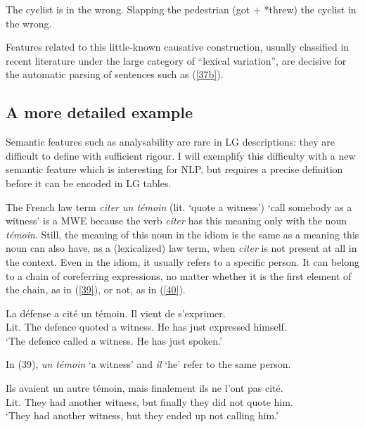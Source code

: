 \documentclass[output=paper]{langsci/langscibook}
\begin{document}
 \begin{exe}
\ex \label{38} 
\begin{xlist}
\ex \label{38a}
The cyclist is in the wrong.
\ex \label{38b} 
Slapping the pedestrian (got $+$ *threw) the cyclist in the wrong.
\end{xlist}
\end{exe}
       

\noindent Features related to this little-known causative construction, usually classified in recent literature under the large category of “lexical variation”, are decisive for the automatic parsing of sentences such as (\ref{37b}).

\subsection{A more detailed example} 

Semantic features such as analysability are rare in LG descriptions: they are difficult to define with sufficient rigour. I will exemplify this difficulty with a new semantic feature which is interesting for NLP, but requires a precise definition before it can be encoded in LG tables.

The French law term \textit{citer un témoin} (lit. `quote a witness') ‘call somebody as a witness’ is a MWE because the verb \textit{citer} has this meaning only with the noun \textit{témoin}. Still, the meaning of this noun in the idiom is the same as a meaning this noun can also have, as a (lexicalized) law term, when \textit{citer} is not present at all in the context. Even in the idiom, it usually refers to a specific person. It can belong to a chain of coreferring expressions, no matter whether it is the first element of the chain, as in (\ref{39}), or not, as in (\ref{40}).


\begin{exe}
\ex \label{39}
La défense a cité un témoin. Il vient de s’exprimer.\\
Lit. The defence  quoted a witness. He has just expressed himself. \\
‘The defence called a witness. He has just spoken.’
\end{exe}

\noindent In (39), \textit{un témoin} ‘a witness’ and \textit{il} ‘he’ refer to the same person.


\begin{exe}
\ex \label{40}
Ils avaient {un autre} témoin, mais finalement ils ne l’ont pas cité.\\
Lit. They had another witness, but finally they did not quote him.\\
‘They had another witness, but they ended up not calling him.’
\end{exe} 
\end{document}
